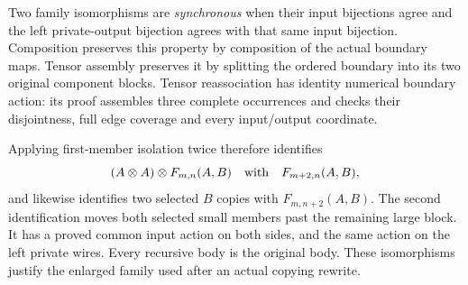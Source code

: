 \par{}
\par{}
\par{}
\par{}
\par{}
%

Two family isomorphisms are \emph{synchronous} when their input bijections
agree and the left private-output bijection agrees with that same input
bijection. Composition preserves this property by composition of the
actual boundary maps. Tensor assembly preserves it by splitting the
ordered boundary into its two original component blocks. Tensor
reassociation has identity numerical boundary action: its proof assembles
three complete occurrences and checks their disjointness, full edge
coverage and every input/output coordinate.

Applying first-member isolation twice therefore identifies
\[
 (A\otimes A)\otimes F_{m,n}(A,B)
       \quad\hbox{with}\quad F_{m+2,n}(A,B),
\]
and likewise identifies two selected $B$ copies with $F_{m,n+2}(A,B)$.
The second identification moves both selected small members past the
remaining large block. It has a proved common input action on both sides,
and the same action on the left private wires. Every recursive body is the
original body. These isomorphisms justify the enlarged family used after
an actual copying rewrite.

